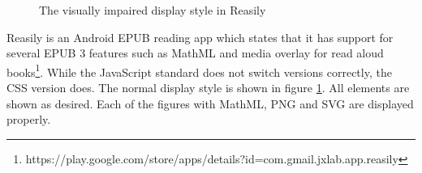 \begin{figure}[h]
\begin{minipage}{0.47\textwidth}
	\end{minipage}
	
	\caption{The visually impaired display style in Reasily}
	\label{fig:reasilyNo}
\end{figure}
Reasily is an Android EPUB reading app which states that it has support for several EPUB 3 features such as MathML and media overlay for read aloud books\footnote{https://play.google.com/store/apps/details?id=com.gmail.jxlab.app.reasily}. While the JavaScript standard does not switch versions correctly, the CSS version does. The normal display style is shown in figure \ref{fig:reasilyNo}. All elements are shown as desired. Each of the figures with MathML, PNG and SVG are displayed properly. 

